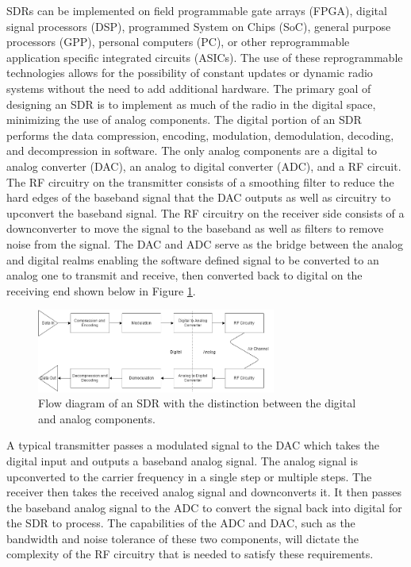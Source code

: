 SDRs can be implemented on field programmable gate arrays (FPGA), digital signal processors (DSP), programmed System on Chips (SoC), general purpose processors (GPP), personal computers (PC), or other reprogrammable application specific integrated circuits (ASICs). The use of these reprogrammable technologies allows for the possibility of constant updates or dynamic radio systems without the need to add additional hardware. The primary goal of designing an SDR is to implement as much of the radio in the digital space, minimizing the use of analog components. The digital portion of an SDR performs the data compression, encoding, modulation, demodulation, decoding, and decompression in software. The only analog components are a digital to analog converter (DAC), an analog to digital converter (ADC), and a RF circuit. The RF circuitry on the transmitter consists of a smoothing filter to reduce the hard edges of the baseband signal that the DAC outputs as well as circuitry to upconvert the baseband signal. The RF circuitry on the receiver side consists of a downconverter to move the signal to the baseband as well as filters to remove noise from the signal. The DAC and ADC serve as the bridge between the analog and digital realms enabling the software defined signal to be converted to an analog one to transmit and receive, then converted back to digital on the receiving end shown below in Figure \ref{fig:sdr_flow_diagram}.
\begin{figure}[ht]
\centering
\includegraphics[width=0.70\textwidth]{img/sdr_diagram.png}
\caption{Flow diagram of an SDR with the distinction between the digital and analog components.}
\label{fig:sdr_flow_diagram}
\end{figure}\par
A typical transmitter passes a modulated signal to the DAC which takes the digital input and outputs a baseband analog signal. The analog signal is upconverted to the carrier frequency in a single step or multiple steps. The receiver then takes the received analog signal and downconverts it. It then passes the baseband analog signal to the ADC to convert the signal back into digital for the SDR to process. The capabilities of the ADC and DAC, such as the bandwidth and noise tolerance of these two components, will dictate the complexity of the RF circuitry that is needed to satisfy these requirements.\par
